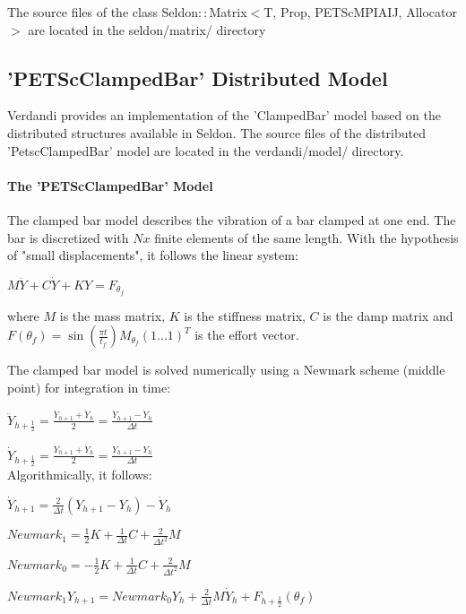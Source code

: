 \documentclass{tufte-book}
\begin{document}
The source files of the class Seldon$::$Matrix$<$T, Prop, PETScMPIAIJ, Allocator$>$   are located in the seldon/matrix/ directory



\hypertarget{seq-par-dm}{}\subsection{'PETScClampedBar' Distributed Model}\label{seq-par-dm}


Verdandi provides an implementation of the 'ClampedBar' model based on the distributed structures available in Seldon. The source files of the distributed 'PetscClampedBar' model are located in the verdandi/model/ directory.



\hypertarget{seq-par-dm-m}{}\paragraph{The 'PETScClampedBar' Model}\label{seq-par-dm-m}


The clamped bar model describes the vibration of a bar clamped at one end. The bar is discretized with $Nx$ finite elements of the same length. With the hypothesis of "small displacements", it follows the linear system:

\begin{center} $ M \ddot Y + C \dot Y + K Y = F_{\theta_f}$ \par
 \end{center}

 where $M$  is the mass matrix, $K$  is the stiffness matrix,  $C$  is the damp matrix and  $F(\theta_f) = \sin(\frac{\pi t}{t_f}) M_{\theta_f} (1 ... 1)^T$  is the effort vector.


 The clamped bar model is solved numerically using a Newmark scheme (middle point) for integration in time:

 $ \ddot Y_{h + \frac{1}{2}} = \frac{\ddot Y_{h+1} + \ddot Y_{h} }2 = \frac{\dot Y_{h+1} - \dot Y_{h} } {\Delta t} $ \par
$ \dot Y_{h + \frac{1}{2}} = \frac{\dot Y_{h+1} + \dot Y_{h} }2 = \frac{Y_{h+1} - Y_{h} } {\Delta t} $\\


Algorithmically, it follows:

$ \dot Y_{h + 1} = \frac{2}{\Delta t}(Y_{h+1} - Y_{h}) - \dot Y_{h} $ \par
$Newmark_1 = \frac{1}2K + \frac{1}{\Delta t}C + \frac{2}{\Delta t^2}M$ \par
$Newmark_0 = -\frac{1}2 K + \frac{1}{\Delta t}C + \frac{2}{\Delta t^2}M$ \par
$Newmark_1Y_{h+1} = Newmark_0Y_{h} + \frac{2}{\Delta t}M\dot Y_{h} + F_{h + \frac{1}{2}}(\theta_f)$\\
\end{document}
